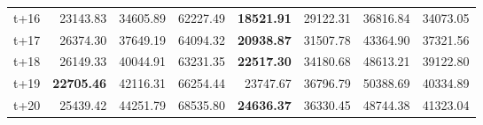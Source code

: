 \begin{table}[H]
\begin{tabular}{lrrrrrrr}
t+16  & 23143.83  & 34605.89  & 62227.49  & \textbf{18521.91}  & 29122.31  & 36816.84  & 34073.05  \\
t+17  & 26374.30  & 37649.19  & 64094.32  & \textbf{20938.87}  & 31507.78  & 43364.90  & 37321.56  \\
t+18  & 26149.33  & 40044.91  & 63231.35  & \textbf{22517.30}  & 34180.68  & 48613.21  & 39122.80  \\
t+19  & \textbf{22705.46}  & 42116.31  & 66254.44  & 23747.67  & 36796.79  & 50388.69  & 40334.89  \\
t+20  & 25439.42  & 44251.79  & 68535.80  & \textbf{24636.37}  & 36330.45  & 48744.38  & 41323.04  \\

\bottomrule
\end{tabular}
\end{table}
